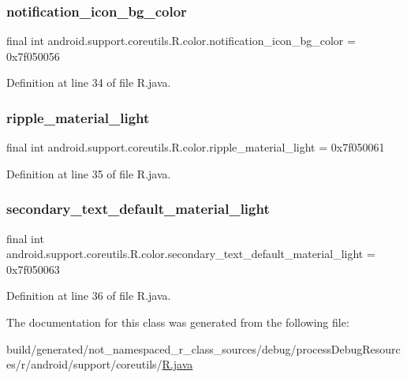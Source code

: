 \subsubsection{\texorpdfstring{notification\_icon\_bg\_color}{notification\_icon\_bg\_color}}
{\footnotesize\ttfamily final int android.\+support.\+coreutils.\+R.\+color.\+notification\+\_\+icon\+\_\+bg\+\_\+color = 0x7f050056\hspace{0.3cm}{\ttfamily [static]}}



Definition at line 34 of file R.\+java.

\mbox{\label{classandroid_1_1support_1_1coreutils_1_1_r_1_1color_a2bb831d5cf5464fbe7a270446353ed6f}} 
\subsubsection{\texorpdfstring{ripple\_material\_light}{ripple\_material\_light}}
{\footnotesize\ttfamily final int android.\+support.\+coreutils.\+R.\+color.\+ripple\+\_\+material\+\_\+light = 0x7f050061\hspace{0.3cm}{\ttfamily [static]}}



Definition at line 35 of file R.\+java.

\mbox{\label{classandroid_1_1support_1_1coreutils_1_1_r_1_1color_aae8ae33c65014cccc6bfd139de0c1990}} 
\subsubsection{\texorpdfstring{secondary\_text\_default\_material\_light}{secondary\_text\_default\_material\_light}}
{\footnotesize\ttfamily final int android.\+support.\+coreutils.\+R.\+color.\+secondary\+\_\+text\+\_\+default\+\_\+material\+\_\+light = 0x7f050063\hspace{0.3cm}{\ttfamily [static]}}



Definition at line 36 of file R.\+java.



The documentation for this class was generated from the following file\+:\begin{DoxyCompactItemize}
\item 
build/generated/not\+\_\+namespaced\+\_\+r\+\_\+class\+\_\+sources/debug/process\+Debug\+Resources/r/android/support/coreutils/\mbox{\hyperlink{android_2support_2coreutils_2_r_8java}{R.\+java}}\end{DoxyCompactItemize}
